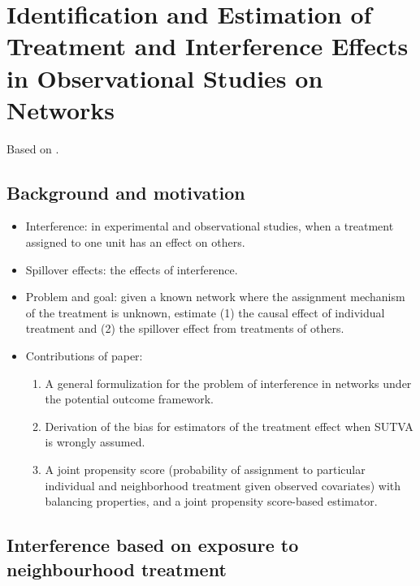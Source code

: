 \documentclass[10pt]{article}
\begin{document}
\section{Identification and Estimation of Treatment and Interference Effects in Observational Studies on Networks}

Based on \parencite{Forastiere:2021}.

\subsection{Background and motivation}

\begin{itemize}

\item
Interference: in experimental and observational studies, when a treatment assigned to one unit has an effect on others.

\item
Spillover effects: the effects of interference.

\item
Problem and goal: given a known network where the assignment mechanism of the treatment is unknown, estimate (1) the causal effect of individual treatment and (2) the spillover effect from treatments of others.

\item
Contributions of paper:
\begin{enumerate}
\item
A general formulization for the problem of interference in networks under the potential outcome framework.
\item
Derivation of the bias for estimators of the treatment effect when SUTVA is wrongly assumed.
\item
A joint propensity score (probability of assignment to particular individual and neighborhood treatment given observed covariates) with balancing properties, and a joint propensity score-based estimator.
\end{enumerate}

\end{itemize}

\subsection{Interference based on exposure to neighbourhood treatment}
\end{document}
